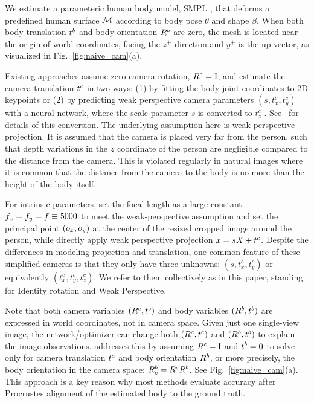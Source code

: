 \documentclass[10pt,twocolumn,letterpaper,usenames,dvipsnames]{article}
\begin{document}
We estimate a parameteric human body model, SMPL \cite{looper_smpl,SMPL-X:2019}, that deforms a predefined human surface $\mathcal{M}$ according to body pose $\theta$ and shape $\beta$. When both body translation $t^b$ and body orientation $R^b$ are zero, the mesh is located near the origin of world coordinates, facing the $z^{+}$ direction and $y^{+}$ is the up-vector, as visualized in Fig.~\ref{fig:naive_cam}(a).

Existing approaches \cite{bogo_smplify,expose2020eccv,guler_2019_CVPR,jiang2020mpshape,kanazawa_hmr,kocabas2019vibe,SMPL-X:2019,song2020human,CenterHMR} assume zero camera rotation, $R^c = \text{I}$, and estimate the camera translation $t^c$ in two ways: 
(1) by fitting the body joint coordinates to 2D keypoints \cite{bogo_smplify,SMPL-X:2019,zanfir2020weakly} or 
(2) by predicting weak perspective camera parameters $(s, t_x^c, t_y^c)$ with a neural network, where the scale parameter $s$ is converted to $t_z^c$ \cite{kanazawa_hmr,kanazawa_temporal_hmr,kocabas2019vibe,SPIN:ICCV:2019}. See \supmat~for details of this conversion.
The underlying assumption here is weak perspective projection. 
It is assumed that the camera is placed very far from the person, such that depth variations in the $z$ coordinate of the person are negligible compared to the distance from the camera. This is violated regularly in natural images where it is common that the distance from the camera to the body is no more than the height of the body itself.

For intrinsic parameters, \cite{bogo_smplify,kocabas2019vibe,SPIN:ICCV:2019,SMPL-X:2019} set the focal length as a large constant $f_x = f_y = f \equiv 5000$ to meet the weak-perspective assumption and set the principal point $(o_x, o_y)$ at the center of the resized cropped image around the person, while \cite{kanazawa_hmr,CenterHMR,zanfir2020weakly} directly apply weak perspective projection $x = sX + t^c$. Despite the differences in modeling projection and translation, one common feature of these simplified cameras is that they only have three unknowns: $(s, t_x^c, t_y^c)$ or equivalently $(t_x^c, t_y^c, t_z^c)$. 
We refer to them collectively as \emph{\iwcam} in this paper, standing for Identity rotation and Weak Perspective.

Note that both camera variables $(R^c, t^c)$ and body variables $(R^b, t^b)$ are expressed in world coordinates, not in camera space.   
Given just one single-view image, the network/optimizer can change both $(R^c, t^c)$ and $(R^b, t^b)$ to explain the image observations. 
\iwcam addresses this by assuming $R^c = \text{I}$ and $t^b=0$ to solve only for camera translation $t^c$ and body orientation $R^b$, or more precisely, the body orientation in the camera space: $R^b_c = R^c R^b$.
See Fig.~\ref{fig:naive_cam}(a).
This approach is a key reason why most methods evaluate accuracy after Procrustes alignment of the estimated body to the ground truth.
\end{document}
